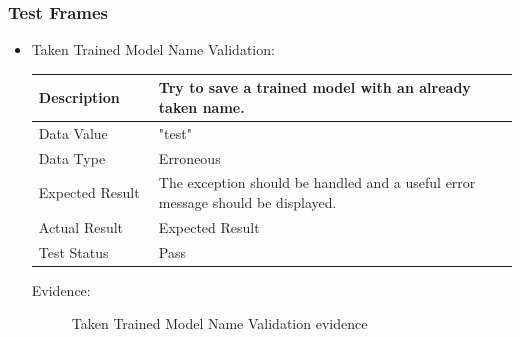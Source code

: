 \documentclass[./project-report/src/latex/project-report.tex]{subfiles}
\begin{document}
\pagebreak

\subsubsection{Test Frames}
\label{sec:test-frames-input-validation}
\begin{itemize}
	\item Taken Trained Model Name Validation: \newline\newline
		\begin{tabular}{|p{0.25\linewidth}|p{0.75\linewidth}|}
			\hline
			Description & Try to save a trained model with an already taken name. \\
			\hline
			Data Value & "test" \\
			\hline
			Data Type & Erroneous \\
			\hline
			Expected Result & The exception should be handled and a useful error message should be displayed. \\
			\hline
			Actual Result & Expected Result \\
			\hline
			Test Status & Pass \\
			\hline
		\end{tabular}

		\vspace{5mm}

		Evidence:
		\begin{figure}[h!]
		\centering
		\caption{Taken Trained Model Name Validation evidence}
		\end{figure}


\end{itemize}
\end{document}

